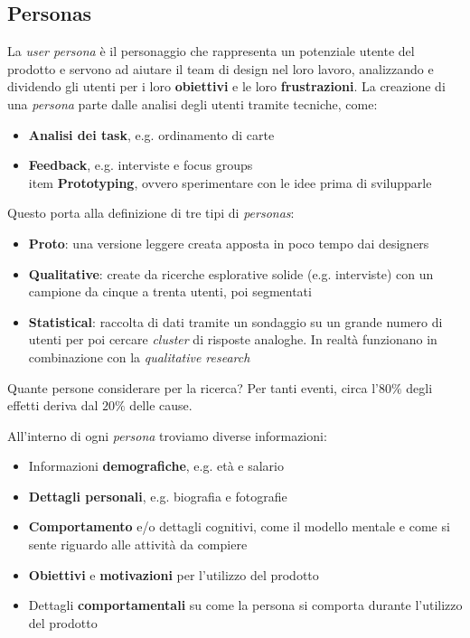 \subsection{Personas}
La \textit{user persona} è il personaggio che rappresenta un potenziale utente del prodotto e servono ad aiutare il team di design nel loro lavoro, analizzando e dividendo gli utenti per i loro \textbf{obiettivi} e le loro \textbf{frustrazioni}. La creazione di una \textit{persona} parte dalle analisi degli utenti tramite tecniche, come:
\begin{itemize}
	\item \textbf{Analisi dei task}, e.g. ordinamento di carte
	\item \textbf{Feedback}, e.g. interviste e focus groups
	\\item \textbf{Prototyping}, ovvero sperimentare con le idee prima di svilupparle
\end{itemize}
Questo porta alla definizione di tre tipi di \textit{personas}:
\begin{itemize}
	\item \textbf{Proto}: una versione leggere creata apposta in poco tempo dai designers
	\item \textbf{Qualitative}: create da ricerche esplorative solide (e.g. interviste) con un campione da cinque a trenta utenti, poi segmentati
	\item \textbf{Statistical}: raccolta di dati tramite un sondaggio su un grande numero di utenti per poi cercare \textit{cluster} di risposte analoghe. In realtà funzionano in combinazione con la \textit{qualitative research}
\end{itemize}

\begin{note}
	Quante persone considerare per la ricerca? Per tanti eventi, circa l'$80\%$ degli effetti deriva dal $20\%$ delle cause.
\end{note}

All'interno di ogni \textit{persona} troviamo diverse informazioni:
\begin{itemize}
	\item Informazioni \textbf{demografiche}, e.g. età e salario
	\item \textbf{Dettagli personali}, e.g. biografia e fotografie
	\item \textbf{Comportamento} e/o dettagli cognitivi, come il modello mentale e come si sente riguardo alle attività da compiere
	\item \textbf{Obiettivi} e \textbf{motivazioni} per l'utilizzo del prodotto
	\item Dettagli \textbf{comportamentali} su come la persona si comporta durante l'utilizzo del prodotto
\end{itemize}

